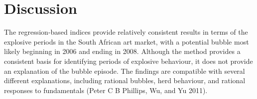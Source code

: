 \documentclass[]{elsarticle} %
\begin{document}
\begin{table}[ht]
\centering
\caption{Dates of explosive behaviour by segment} 
\end{table}

\section{Discussion}\label{discussion}

The regression-based indices provide relatively consistent results in
terms of the explosive periods in the South African art market, with a
potential bubble most likely beginning in 2006 and ending in 2008.
Although the method provides a consistent basis for identifying periods
of explosive behaviour, it does not provide an explanation of the bubble
episode. The findings are compatible with several different
explanations, including rational bubbles, herd behaviour, and rational
responses to fundamentals (Peter C B Phillips, Wu, and Yu 2011).
\end{document}
